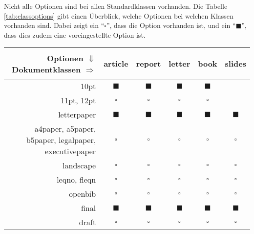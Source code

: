 Nicht alle Optionen sind bei allen Standardklassen vorhanden. Die Tabelle \ref{tab:classoptions} gibt einen Überblick, welche Optionen bei welchen Klassen vorhanden sind. Dabei zeigt ein \enquote{$\square$}, dass die Option vorhanden ist, und ein \enquote{$\blacksquare$}, dass dies zudem eine voreingestellte Option ist.

\begin{table}[htbp]
	\begin{center}
		\begin{tabular}{r|c|c|c|c|c}
			Optionen $\Downarrow$ Dokumentklassen $\Rightarrow$ &
			\begin{sideways} article \end{sideways} &
			\begin{sideways} report \end{sideways} &
			\begin{sideways} letter \end{sideways} &
			\begin{sideways} book \end{sideways} &
			\begin{sideways} slides \end{sideways}
			\\ \hline
			10pt &
			$\blacksquare$ &
			$\blacksquare$ &
			$\blacksquare$ &
			$\blacksquare$ &
			\\ \hline
			11pt, 12pt &
			$\square$ &
			$\square$ &
			$\square$ &
			$\square$ &
			\\ \hline
			letterpaper &
			$\blacksquare$ &
			$\blacksquare$ &
			$\blacksquare$ &
			$\blacksquare$ &
			$\blacksquare$ \\ \hline
			a4paper, a5paper, b5paper, legalpaper, executivepaper &
			$\square$ &
			$\square$ &
			$\square$ &
			$\square$ &
			$\square$ \\ \hline
			landscape &
			$\square$ &
			$\square$ &
			$\square$ &
			$\square$ &
			$\square$ \\ \hline
			leqno, fleqn &
			$\square$ &
			$\square$ &
			$\square$ &
			$\square$ &
			$\square$ \\ \hline
			openbib &
			$\square$ &
			$\square$ &
			$\square$ &
			$\square$ &
			$\square$ \\ \hline
			final &
			$\blacksquare$ &
			$\blacksquare$ &
			$\blacksquare$ &
			$\blacksquare$ &
			$\blacksquare$ \\ \hline
			draft &
			$\square$ &
			$\square$ &
			$\square$ &
			$\square$ &
			$\square$ \\ \hline

\end{tabular}
\end{center}
\end{table}
